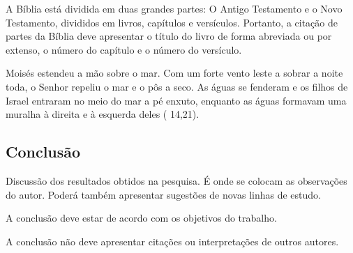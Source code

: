 A Bíblia está dividida em duas grandes partes: O Antigo Testamento e o Novo Testamento, divididos em livros, capítulos e versículos.
Portanto, a citação de partes da Bíblia deve apresentar o título do livro de forma abreviada ou por extenso, o número do capítulo e o número do versículo.


\begin{citacaodireta}
	Moisés estendeu a mão sobre o mar. Com um forte \hspace{-0.1cm} vento \hspace{0.1cm} leste a \hspace{0.1cm}sobrar a
	noite toda, o Senhor repeliu o mar e o pôs a seco. As águas se fenderam e
	os filhos de Israel entraram no meio do mar a pé enxuto, enquanto as águas
	formavam uma muralha à direita e à esquerda deles (\citeauthor{biblia} 14,21).
\end{citacaodireta}

\subsection{\esp Conclusão}

Discussão dos resultados obtidos na pesquisa. É onde se colocam as observações do autor.
Poderá também apresentar sugestões de novas linhas de estudo.

A conclusão deve estar de acordo com os objetivos do trabalho.

A conclusão não deve apresentar citações ou interpretações de outros autores.

% 
